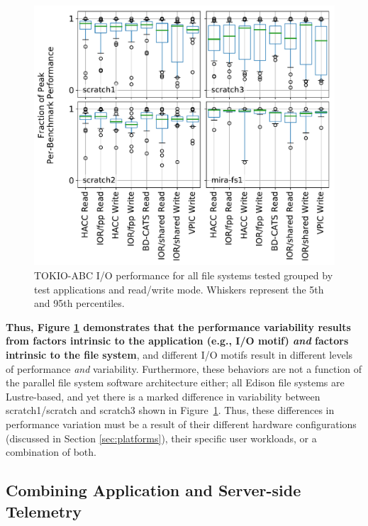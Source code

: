 \documentclass[conference,10pt,compsocconf]{IEEEtran}
\begin{document}
\begin{figure}[t]
    \centering
    \includegraphics[width=1.0\columnwidth]{figs/perf-boxplots.pdf}
    \caption{TOKIO-ABC I/O performance for all file systems tested grouped by test
    applications and read/write mode.  Whiskers represent the 5th and 95th
    percentiles.}
    \label{fig:perf-summary-boxplots-motif}
\end{figure}

\textbf{Thus, Figure \ref{fig:perf-summary-boxplots-motif} demonstrates that the
performance variability results from factors intrinsic to the application (e.g., I/O motif) \emph{and} factors intrinsic to the file system}, and
different I/O motifs result in different levels of performance \emph{and} variability.
Furthermore, these behaviors are not a function of the parallel file system software architecture either; all Edison file systems are Lustre-based, and yet there is a marked difference in variability between scratch1/scratch and scratch3 shown in Figure~\ref{fig:perf-summary-boxplots-motif}.
Thus, these differences in performance variation must be a result of their different hardware configurations (discussed in Section \ref{sec:platforms}), their specific user workloads, or a combination of both.

\subsection{Combining Application and Server-side Telemetry} \label{sec:results/combining}
\end{document}
